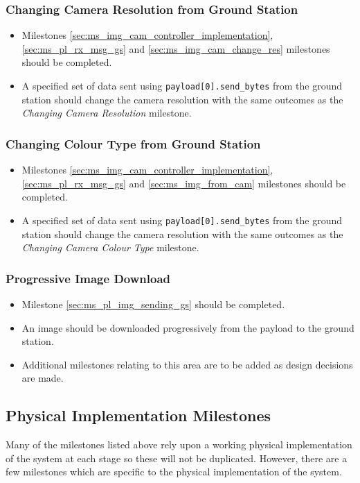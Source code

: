 	\subsubsection{Changing Camera Resolution from Ground Station}
		\label{sec:ms_pl_img_gs_cam_res}
		\begin{itemize}
			\item 	Milestones \ref{sec:ms_img_cam_controller_implementation}, \ref{sec:ms_pl_rx_msg_gs} and 
				\ref{sec:ms_img_cam_change_res} milestones should be completed.
			\item 	A specified set of data sent using \verb+payload[0].send_bytes+
				from the ground station should change the camera resolution with 
				the same outcomes as the \emph{Changing Camera Resolution} milestone.
		\end{itemize}


	\subsubsection{Changing Colour Type from Ground Station}
		\label{sec:ms_pl_img_gs_cam_colour_type}
		\begin{itemize}
			\item 	Milestones \ref{sec:ms_img_cam_controller_implementation}, \ref{sec:ms_pl_rx_msg_gs} and 
				\ref{sec:ms_img_from_cam} milestones should be completed.
			\item 	A specified set of data sent using \verb+payload[0].send_bytes+
				from the ground station should change the camera resolution with 
				the same outcomes as the \emph{Changing Camera Colour Type} milestone.
		\end{itemize}

	\subsubsection{Progressive Image Download}
		\label{sec:ms_pl_img_gs_progressive_dl}
		\begin{itemize}
			\item 	Milestone \ref{sec:ms_pl_img_sending_gs} should be completed.
			\item 	An image should be downloaded progressively from the payload to the
				ground station.
			\item 	Additional milestones relating to this area are to be added as design decisions
				are made.
		\end{itemize}

\subsection{Physical Implementation Milestones}
Many of the milestones listed above rely upon a working physical implementation of the system at each stage
so these will not be duplicated. However, there are a few milestones which are specific to the physical implementation
of the system.

